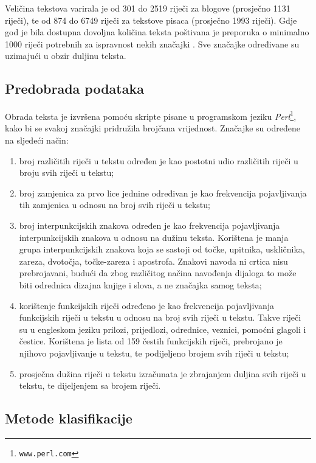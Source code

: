 \documentclass[10pt, a4paper]{article}
\begin{document}
Veličina tekstova varirala je od 301 do 2519 riječi za blogove (prosječno 1131 riječi), te od 874 do 6749 riječi za tekstove pisaca (prosječno 1993 riječi). Gdje god je bila dostupna dovoljna količina teksta poštivana je preporuka o minimalno 1000 riječi potrebnih za ispravnost nekih značajki  \citep{tweedie}. Sve značajke određivane su uzimajući u obzir duljinu teksta. 

\subsection{Predobrada podataka}
Obrada teksta je izvršena pomoću skripte pisane u programskom jeziku \emph{Perl}\footnote{\texttt{www.perl.com}}, kako bi se svakoj značajki pridružila brojčana vrijednost. Značajke su određene na sljedeći način:
\begin{enumerate}
\item broj različitih riječi u tekstu određen je kao postotni udio različitih riječi u broju svih riječi u tekstu;
\item broj zamjenica za prvo lice jednine određivan je kao frekvencija pojavljivanja tih zamjenica u odnosu na broj svih riječi u tekstu;
\item broj interpunkcijskih znakova određen je kao frekvencija pojavljivanja interpunkcijskih znakova u odnosu na dužinu teksta. Korištena je manja grupa interpunkcijskih znakova koja se sastoji od točke, upitnika, uskličnika, zareza, dvotočja, točke-zareza i apostrofa. Znakovi navoda ni crtica nisu prebrojavani, budući da zbog različitog načina navođenja dijaloga to može biti odrednica dizajna knjige i slova, a ne značajka samog teksta;
\item korištenje funkcijskih riječi određeno je kao frekvencija pojavljivanja funkcijskih riječi u tekstu u odnosu na broj svih riječi u tekstu. Takve riječi su u engleskom jeziku prilozi, prijedlozi, odrednice, veznici, pomoćni glagoli i čestice. Korištena je lista od 159 čestih funkcijskih riječi, prebrojano je njihovo pojavljivanje u tekstu, te podijeljeno brojem svih riječi u tekstu;
\item prosječna dužina riječi u tekstu izračunata je zbrajanjem duljina svih riječi u tekstu, te dijeljenjem sa brojem riječi.
\end{enumerate}


\subsection{Metode klasifikacije}
\end{document}
